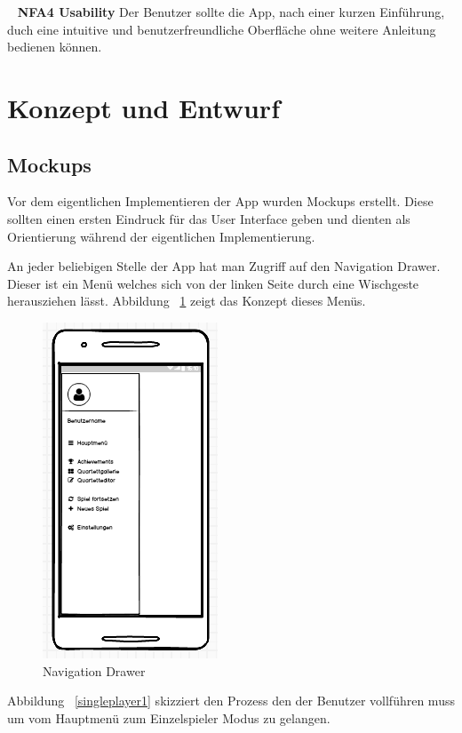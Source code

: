 \documentclass{scrartcl}
\begin{document}
\ \newline
\textbf{NFA4 Usability} \newline
Der Benutzer sollte die App, nach einer kurzen Einführung, duch eine intuitive
und benutzerfreundliche Oberfläche ohne weitere Anleitung bedienen können.

\section{Konzept und Entwurf}
\subsection{Mockups}
Vor dem eigentlichen Implementieren der App wurden Mockups erstellt. Diese sollten einen ersten Eindruck für das User Interface geben und dienten als Orientierung während der eigentlichen Implementierung.

An jeder beliebigen Stelle der App hat man Zugriff auf den Navigation Drawer. Dieser ist ein Menü welches sich von der linken Seite durch eine Wischgeste herausziehen lässt. Abbildung ~\ref{drawer} zeigt das Konzept dieses Menüs.

\begin{figure}[h]
	\centering
	\includegraphics[scale=0.75]{img/mockup_drawer.png}
	\caption{Navigation Drawer}
	\label{drawer}
\end{figure}

Abbildung ~\ref{singleplayer1} skizziert den Prozess den der Benutzer vollführen muss um vom Hauptmenü zum Einzelspieler Modus zu gelangen.
\end{document}
